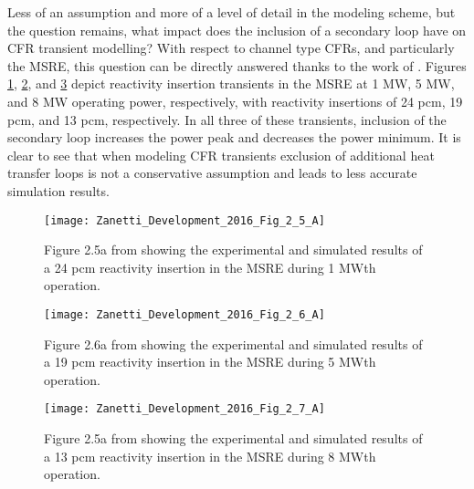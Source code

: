 \documentclass[review]{elsarticle}
\begin{document}
\par Less of an assumption and more of a level of detail in the modeling scheme,
but the question remains, what impact does the inclusion of a secondary loop
have on CFR transient modelling? With respect to channel type CFRs, and
particularly the MSRE, this question can be directly answered thanks to the work
of \cite{zanetti_development_2016}. Figures \ref{fig:zanetti_sec_1mw},
\ref{fig:zanetti_sec_5mw}, and \ref{fig:zanetti_sec_8mw} 
depict reactivity insertion
transients in the MSRE at 1 MW, 5 MW, and 8 MW operating power, respectively,
with reactivity insertions of 24 pcm, 19 pcm, and 13 pcm,
respectively. In all three of these transients, inclusion of the secondary loop
increases the power peak and decreases the power minimum. It is clear to see
that when modeling CFR transients exclusion of additional heat transfer
loops is not a conservative assumption and leads to less accurate simulation
results.

\begin{figure}[H]
   \centering
   \texttt{[image: Zanetti\_Development\_2016\_Fig\_2\_5\_A]}
   \caption{Figure 2.5a from \cite{zanetti_development_2016} showing the
    experimental and
   simulated results of a 24 pcm reactivity insertion in the MSRE during
    1 MWth operation.} 
   \label{fig:zanetti_sec_1mw}
\end{figure}

\begin{figure}[H]
   \centering
   \texttt{[image: Zanetti\_Development\_2016\_Fig\_2\_6\_A]}
   \caption{Figure 2.6a from \cite{zanetti_development_2016} showing the
    experimental and
   simulated results of a 19 pcm reactivity insertion in the MSRE during 5 MWth operation.} 
   \label{fig:zanetti_sec_5mw}
\end{figure}

\begin{figure}[H]
   \centering
   \texttt{[image: Zanetti\_Development\_2016\_Fig\_2\_7\_A]}
   \caption{Figure 2.5a from \cite{zanetti_development_2016} showing the experimental and simulated
   results of a 13 pcm reactivity insertion in the MSRE during 8 MWth operation.} 
   \label{fig:zanetti_sec_8mw}
\end{figure}
\end{document}
